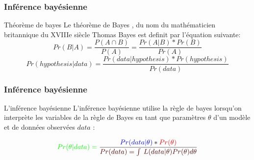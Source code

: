 \documentclass[aspectratio=169,professionalfonts, 12pt]{beamer}
\begin{document}
\begin{frame}
  \frametitle{Inférence bayésienne}
  \justifying 
  \begin{minipage}{\textwidth}
  \begin{block}{Théorème de bayes}
    Le théorème de Bayes , du nom du mathématicien britannique du XVIIIe siècle Thomas Bayes est definit par l'équation suivante:   
    \begin{equation}
      Pr(B|A) = \frac{P(A\cap B)}{P(A)} = \frac{Pr(A|B)*Pr(B)}{Pr(A)}
      \label{theoreme_bayes}
    \end{equation} 
    \begin{equation}
      Pr(hypothesis|data) = \frac{Pr(data|hypothesis)*Pr(hypothesis)}{Pr(data)}
      \label{theoreme_bayes2}
    \end{equation}
  \end{block}
  \end{minipage} 
\end{frame}


\begin{frame}
  \frametitle{Inférence bayésienne}
  \justifying 
  \begin{minipage}{\textwidth}
  \begin{block}{L'inférence bayésienne}
    L'inférence bayésienne utilise la règle de bayes lorsqu’on interprète les variables de la règle de Bayes en tant que paramètres \(\displaystyle \theta \) d'un modèle et de données observées \(\displaystyle data \) : 
  \end{block}
  \end{minipage}
  \begin{minipage}{\textwidth}
    \centering
    \begin{equation}
      \color{green} Pr(\theta|data) = \color{black} \frac{ \color{blue} Pr(data|\theta)\color{black} * \color{red}Pr(\theta)}{ \color{blueforest} Pr(data) =  \int_{}^{}  \,L(data|\theta)Pr(\theta)d\theta }
      \label{theoreme_bayes3}
    \end{equation}
  \end{minipage}
\end{frame}
\end{document}
